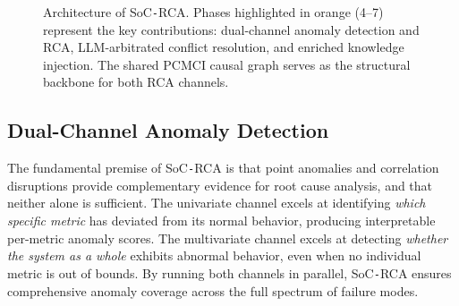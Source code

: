 \documentclass[a4paper,fleqn]{cas-dc}
\newcommand{\sysname}{SoC\texttt{-}RCA}
\begin{document}
\begin{figure}[t]
  \caption{Architecture of \sysname{}.  Phases highlighted in orange (4--7) represent the key contributions: dual-channel anomaly detection and RCA, LLM-arbitrated conflict resolution, and enriched knowledge injection.  The shared PCMCI causal graph serves as the structural backbone for both RCA channels.}
  \label{fig:architecture}
\end{figure}

\subsection{Dual-Channel Anomaly Detection}
\label{sec:dual_detection}

The fundamental premise of \sysname{} is that point anomalies and correlation disruptions provide complementary evidence for root cause analysis, and that neither alone is sufficient.  The univariate channel excels at identifying \emph{which specific metric} has deviated from its normal behavior, producing interpretable per-metric anomaly scores.  The multivariate channel excels at detecting \emph{whether the system as a whole} exhibits abnormal behavior, even when no individual metric is out of bounds.  By running both channels in parallel, \sysname{} ensures comprehensive anomaly coverage across the full spectrum of failure modes.
\end{document}
